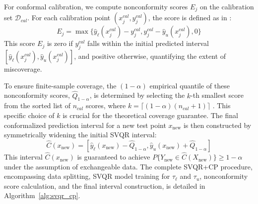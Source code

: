 \documentclass{article}
\begin{document}
For conformal calibration, we compute nonconformity scores $E_j$ on the calibration set $\mathcal{D}_{cal}$. For each calibration point $(x_j^{cal}, y_j^{cal})$, the score is defined as in \citet{Romano2019ConformalizedQR}:
\begin{equation}
\label{eq:nonconformity_score_updated}
E_j = \max\{ \hat{y}_{\ell}(x_j^{cal}) - y_j^{cal}, y_j^{cal} - \hat{y}_{u}(x_j^{cal}), 0 \}
\end{equation}
This score $E_j$ is zero if $y_j^{cal}$ falls within the initial predicted interval $[\hat{y}_{\ell}(x_j^{cal}), \hat{y}_{u}(x_j^{cal})]$, and positive otherwise, quantifying the extent of miscoverage.

To ensure finite-sample coverage, the $(1-\alpha)$ empirical quantile of these nonconformity scores, $\hat{Q}_{1-\alpha}$, is determined by selecting the $k$-th smallest score from the sorted list of $n_{cal}$ scores, where $k = \lceil (1-\alpha)(n_{cal}+1) \rceil$ \citep{Lei2018DistributionFreePC}. This specific choice of $k$ is crucial for the theoretical coverage guarantee. The final conformalized prediction interval for a new test point $x_{\text{new}}$ is then constructed by symmetrically widening the initial SVQR interval:
\begin{equation}
\label{eq:conformal_interval_updated}
\hat{C}(x_{\text{new}}) = [\hat{y}_{\ell}(x_{\text{new}}) - \hat{Q}_{1-\alpha}, \hat{y}_{u}(x_{\text{new}}) + \hat{Q}_{1-\alpha}]
\end{equation}
This interval $\hat{C}(x_{\text{new}})$ is guaranteed to achieve $P\{Y_{\text{new}} \in \hat{C}(X_{\text{new}})\} \ge 1-\alpha$ under the assumption of exchangeable data. The complete SVQR+CP procedure, encompassing data splitting, SVQR model training for $\tau_\ell$ and $\tau_u$, nonconformity score calculation, and the final interval construction, is detailed in Algorithm~\ref{alg:svqr_cp}.
\end{document}
